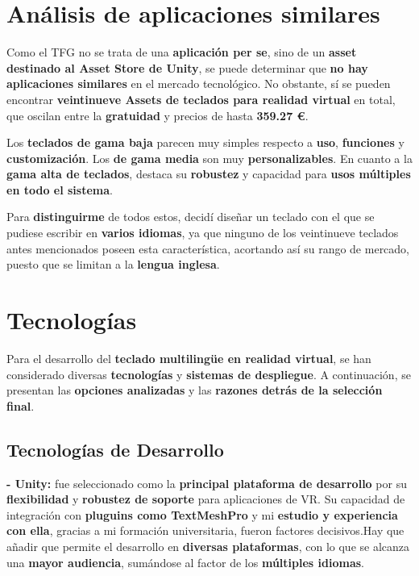 
\section{Análisis de aplicaciones similares}
Como el TFG no se trata de una \textbf{aplicación per se}, sino de un \textbf{asset destinado al Asset Store de Unity}, se puede determinar que \textbf{no hay aplicaciones similares} en el mercado tecnológico. No obstante, sí se pueden encontrar \textbf{veintinueve Assets de teclados para realidad virtual} en total, que oscilan entre la \textbf{gratuidad} y precios de hasta \textbf{359.27 €}.

Los \textbf{teclados de gama baja} parecen muy simples respecto a \textbf{uso}, \textbf{funciones} y \textbf{customización}. Los \textbf{de gama media} son muy \textbf{personalizables}. En cuanto a la \textbf{gama alta de teclados}, destaca su \textbf{robustez} y capacidad para \textbf{usos múltiples en todo el sistema}.

Para \textbf{distinguirme} de todos estos, decidí diseñar un teclado con el que se pudiese escribir en \textbf{varios idiomas}, ya que ninguno de los veintinueve teclados antes mencionados poseen esta característica, acortando así su rango de mercado, puesto que se limitan a la \textbf{lengua inglesa}.

\section{Tecnologías}

Para el desarrollo del \textbf{teclado multilingüe en realidad virtual}, se han considerado diversas \textbf{tecnologías} y \textbf{sistemas de despliegue}. A continuación, se presentan las \textbf{opciones analizadas} y las \textbf{razones detrás de la selección final}.

\subsection{Tecnologías de Desarrollo}

\textbf{- Unity:} fue seleccionado como la \textbf{principal plataforma de desarrollo} por su \textbf{flexibilidad} y \textbf{robustez de soporte} para aplicaciones de VR. Su capacidad de integración con \textbf{pluguins como TextMeshPro} y mi \textbf{estudio y experiencia con ella}, gracias a mi formación universitaria, fueron factores decisivos.Hay que añadir que permite el desarrollo en \textbf{diversas plataformas}, con lo que se alcanza una \textbf{mayor audiencia}, sumándose al factor de los \textbf{múltiples idiomas}.

